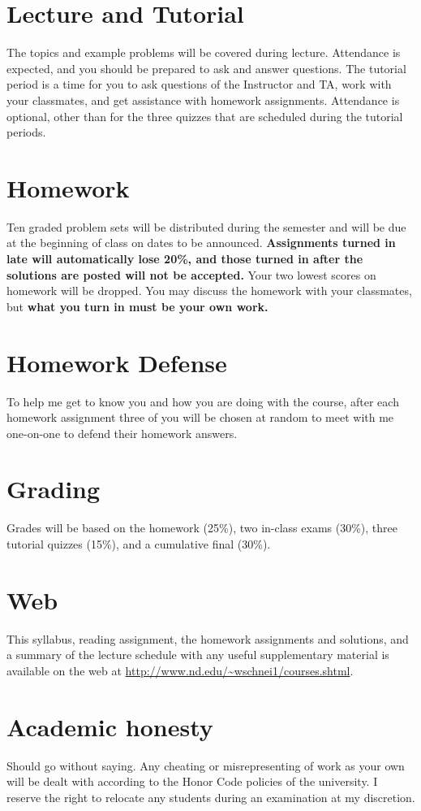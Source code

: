 \documentclass[11pt]{article}
\begin{document}
\section{Lecture and Tutorial}
\label{sec-3}
The topics and example problems will be covered during lecture.  Attendance is
expected, and you should be prepared to ask and answer questions.  The tutorial
period is a time for you to ask questions of the Instructor and TA, work with
your classmates, and get assistance with homework assignments. Attendance is
optional, other than for the three quizzes that are scheduled during the
tutorial periods.

\section{Homework}
\label{sec-4}
Ten graded problem sets will be distributed during the semester and will be due at the beginning of class on dates to be announced.  \textbf{Assignments turned in late will automatically lose 20\%, and those turned in after the solutions are posted will not be accepted.}  Your two lowest scores on homework will be dropped.  You may discuss the homework with your classmates, but \textbf{what you turn in must be your own work.}

\section{Homework Defense}
\label{sec-5}
To help me get to know you and how you are doing with the course, after each homework assignment three of you will be chosen at random to meet with me one-on-one to defend their homework answers.


\section{Grading}
\label{sec-6}
Grades will be based on the homework (25\%), two in-class exams (30\%), three tutorial quizzes (15\%), and a cumulative final (30\%).

\section{Web}
\label{sec-7}
This syllabus, reading assignment, the homework assignments and solutions, and a summary of the lecture schedule with any useful supplementary material is available on the web at \url{http://www.nd.edu/~wschnei1/courses.shtml}.

\section{Academic honesty}
\label{sec-8}
Should go without saying. Any cheating or misrepresenting of work as your own will be dealt with according to the Honor Code policies of the university. I reserve the right to relocate any students during an examination at my discretion.
\end{document}
